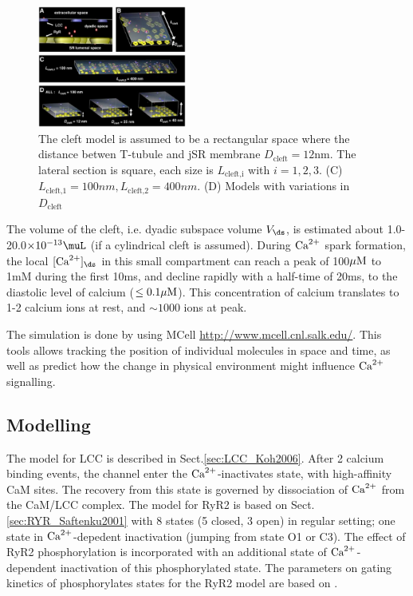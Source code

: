 \begin{figure}[hbt]
  \centerline{\includegraphics[height=4cm,
    angle=0]{./images/dyad_space_Koh2006.eps}}
\caption{The cleft model is assumed to be a rectangular space where the
distance betwen T-tubule and jSR membrane $D_\text{cleft}=12$nm. The lateral
section is square, each size is $L_\text{cleft,i}$ with $i=1,2,3$. (C)
$L_\text{cleft,1}=100nm, L_\text{cleft,2}=400nm$. (D) Models with variations in
$D_\text{cleft}$}
\label{fig:dyad_space_Koh2006}
\end{figure}

The volume of the cleft, i.e. dyadic subspace volume $V_\ds$, is estimated about
1.0-20.0$\times 10^{-13} \muL$ (if a cylindrical cleft is assumed). During ${\text{Ca}^{2+}}$
spark formation, the local $[\Ca]_\ds$ in this small compartment can reach a
peak of 100${\mu\text{M}}$ to 1mM during the first 10ms, and decline rapidly with a
half-time of 20ms, to the diastolic level of calcium ($\le 0.1{\mu\text{M}}$). This
concentration of calcium translates to 1-2 calcium ions at rest, and $\sim 1000$
ions at peak.

\begin{framed}
The simulation is done by using MCell \url{http://www.mcell.cnl.salk.edu/}. This
tools allows tracking the position of individual molecules in space and time, as
well as predict how the change in physical environment might influence ${\text{Ca}^{2+}}$
signalling. 
\end{framed}




\subsection{Modelling}

The model for LCC is described in Sect.\ref{sec:LCC_Koh2006}. After 2 calcium
binding events, the channel enter the ${\text{Ca}^{2+}}$-inactivates state, with
high-affinity CaM sites. The recovery from this state is governed by
dissociation of ${\text{Ca}^{2+}}$ from the CaM/LCC complex. The model for RyR2 is based on
Sect.\ref{sec:RYR_Saftenku2001} with 8 states (5 closed, 3 open) in regular
setting; one state in ${\text{Ca}^{2+}}$-depedent inactivation (jumping from state O1 or C3).
The effect of RyR2 phosphorylation is incorporated with an additional state of
${\text{Ca}^{2+}}$-dependent inactivation of this phosphorylated state.
The parameters on gating kinetics of phosphorylates states for the RyR2 model
are based on \citep{uehara2002}.


